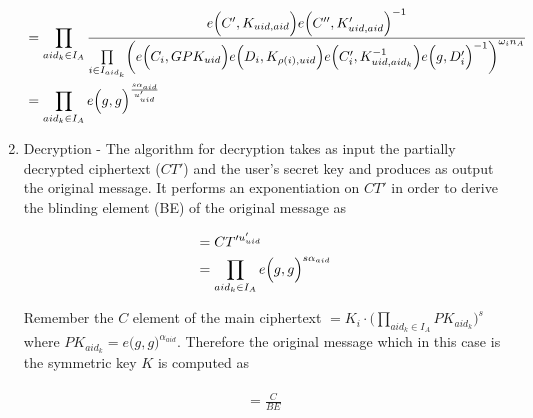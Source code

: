 \begin{enumerate}
	\begin{align}
	&= \prod\limits_{aid_{k} \in I_{A}} \frac{e\Bigl(C', K_{uid,aid}\Bigl)e\Bigl(C'', K'_{uid,aid}\Bigl)^{-1}}{\prod\limits_{i \in I_{aid_k}}\biggl(e\Bigl(C_i, GPK_{uid}\Bigl)e\Bigl(D_i, K_{\rho(i),uid}\Bigl)e\Bigl(C'_i, K_{uid,aid_k}^{-1}\Bigl)e\Bigl(g, D'_i\Bigl)^{-1}\biggl)^{\omega_{i}n_A}} \nonumber \\
	&= \prod\limits_{aid_{k} \in I_{A}} e\Bigl(g, g\Bigl)^{\frac{s\alpha_{aid}}{u'_{uid}}}
	\end{align}
	
	
	
	
	
	\item Decryption - The algorithm for decryption takes as input the partially decrypted ciphertext ($CT'$) and the user's secret key and produces as output the original message. It performs an exponentiation on $CT'$ in order to derive the blinding element (BE) of the original message as
	
	\begin{align}
	\begin{split}
	&= CT'^{u'_{uid}} \\ &= \prod\limits_{aid_{k} \in I_{A}} e\Bigl(g, g\Bigl)^{s\alpha_{aid}}
	\end{split}
	\end{align}
	
	Remember the $C$ element of the main ciphertext $= K_i\cdot\bigl(\prod\limits_{aid_{k} \in I_{A}}PK_{aid_{k}}\bigl)^{s}$ where $PK_{aid_{k}} = e\bigl(g, g\bigl)^{\alpha_{aid}}$. Therefore the original message which in this case is the symmetric key $K$ is computed as
	
	\begin{align}
	\begin{split}
	= \frac{C}{BE}
	\end{split}
	\end{align}
	

\end{enumerate}
